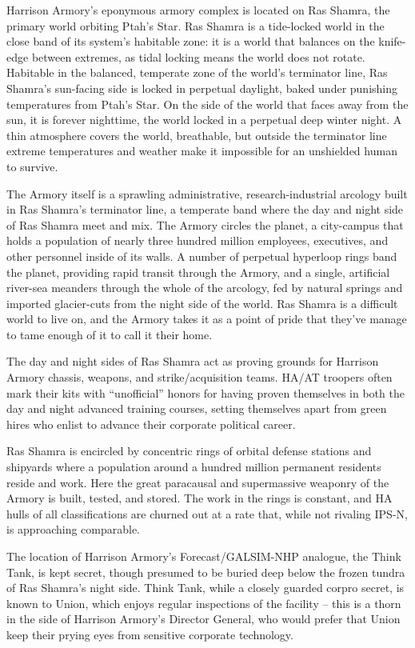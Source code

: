 Harrison Armory's eponymous armory complex is located on Ras Shamra, the primary world
orbiting Ptah's Star. Ras Shamra is a tide-locked world in the close band of its system's habitable
zone: it is a world that balances on the knife-edge between extremes, as tidal locking means the
world does not rotate. Habitable in the balanced, temperate zone of the world's terminator line,
Ras Shamra's sun-facing side is locked in perpetual daylight, baked under punishing
temperatures from Ptah's Star. On the side of the world that faces away from the sun, it is forever
nighttime, the world locked in a perpetual deep winter night. A thin atmosphere covers the world,
breathable, but outside the terminator line extreme temperatures and weather make it impossible
for an unshielded human to survive.

The Armory itself is a sprawling administrative, research-industrial arcology built in Ras Shamra's
terminator line, a temperate band where the day and night side of Ras Shamra meet and mix.
The Armory circles the planet, a city-campus that holds a population of nearly three hundred
million employees, executives, and other personnel inside of its walls. A number of perpetual
hyperloop rings band the planet, providing rapid transit through the Armory, and a single, artificial
river-sea meanders through the whole of the arcology, fed by natural springs and imported
glacier-cuts from the night side of the world. Ras Shamra is a difficult world to live on, and the
Armory takes it as a point of pride that they've manage to tame enough of it to call it their home.

The day and night sides of Ras Shamra act as proving grounds for Harrison Armory chassis,
weapons, and strike/acquisition teams. HA/AT troopers often mark their kits with ``unofficial''
honors for having proven themselves in both the day and night advanced training courses,
setting themselves apart from green hires who enlist to advance their corporate political career.

Ras Shamra is encircled by concentric rings of orbital defense stations and shipyards where a
population around a hundred million permanent residents reside and work. Here the great
paracausal and supermassive weaponry of the Armory is built, tested, and stored. The work in
the rings is constant, and HA hulls of all classifications are churned out at a rate that, while not
rivaling IPS-N, is approaching comparable.

The location of Harrison Armory's Forecast/GALSIM-NHP analogue, the Think Tank, is kept
secret, though presumed to be buried deep below the frozen tundra of Ras Shamra's night side.
Think Tank, while a closely guarded corpro secret, is known to Union, which enjoys regular
inspections of the facility -- this is a thorn in the side of Harrison Armory's Director General, who
would prefer that Union keep their prying eyes from sensitive corporate technology.

